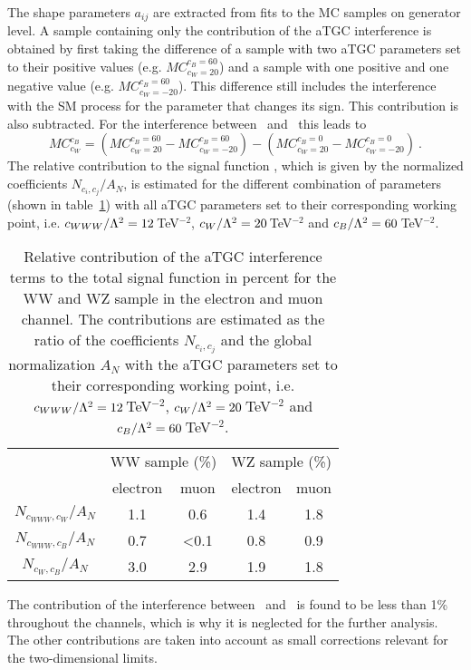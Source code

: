 The shape parameters $a_{ij}$ are extracted from fits to the MC samples on generator level. A sample containing only the contribution of the aTGC interference is obtained by first taking the difference of a sample with two aTGC parameters set to their positive values (e.g. $MC_{c_{W} =20}^{c_{B} =60}$) and a sample with one positive and one negative value (e.g. $MC_{c_{W}=-20}^{c_{B} =60}$). This difference still includes the interference with the SM process for the parameter that changes its sign. This contribution is also subtracted. For the interference between \Tccw \ and \Tcb \ this leads to
\begin{equation}
MC_{c_{W}}^{c_{B}} = \left( MC_{c_{W} =20}^{c_{B} =60}-MC_{c_{W}=-20}^{c_{B} =60} \right) - \left( MC_{c_{W}=20}^{c_B=0}-MC_{c_{W}=-20}^{c_B=0} \right) ~.
\end{equation}
The relative contribution to the signal function , which is given by the normalized coefficients $N_{c_i,c_j}/A_N$, is estimated for the different combination of parameters (shown in table~\ref{tab:signal:relcoef}) with all aTGC parameters set to their corresponding working point, i.e. $c_{WWW}/\Lambda^2=12$\,TeV$^{-2}$, $c_{W}/\Lambda^2=20$\,TeV$^{-2}$ and $c_{B}/\Lambda^2=60$\,TeV$^{-2}$.
\begin{table}
	\centering
	\caption[Relative contribution of the aTGC interference terms to the total signal function]{Relative contribution of the aTGC interference terms to the total signal function in percent for the WW and WZ sample in the electron and muon channel. The contributions are estimated as the ratio of the coefficients $N_{c_i,c_j}$ and the global normalization $A_N$ with the aTGC parameters set to their corresponding working point, i.e. $c_{WWW}/\Lambda^2=12$\,TeV$^{-2}$, $c_{W}/\Lambda^2=20$\,TeV$^{-2}$ and $c_{B}/\Lambda^2=60$\,TeV$^{-2}$.}
	\label{tab:signal:relcoef}
	\begin{tabular}{ccccc}
	\hline
	 & \multicolumn{2}{c}{WW sample (\%)} & \multicolumn{2}{c}{WZ sample (\%)} \\
	 & electron & muon & electron & muon \\
	\hline
	$N_{c_{WWW},c_W}/A_N$ & 1.1 & 0.6  & 1.4 & 1.8 \\
	$N_{c_{WWW},c_B}/A_N$ & 0.7 & <0.1 & 0.8 & 0.9 \\
	$N_{c_W,c_B}/A_N$     & 3.0 & 2.9  & 1.9 & 1.8 \\
	\hline
	\end{tabular}
\end{table}
The contribution of the interference between \Tcwww \ and \Tcb \ is found to be less than 1\% throughout the channels, which is why it is neglected for the further analysis. 
The other contributions are taken into account as small corrections relevant for the two-dimensional limits.
